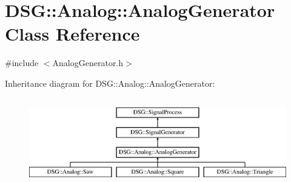 \hypertarget{classDSG_1_1Analog_1_1AnalogGenerator}{\section{D\-S\-G\-:\-:Analog\-:\-:Analog\-Generator Class Reference}
\label{classDSG_1_1Analog_1_1AnalogGenerator}
}


{\ttfamily \#include $<$Analog\-Generator.\-h$>$}

Inheritance diagram for D\-S\-G\-:\-:Analog\-:\-:Analog\-Generator\-:\begin{figure}[H]
\begin{center}
\leavevmode
\includegraphics[height=3.829060cm]{classDSG_1_1Analog_1_1AnalogGenerator}
\end{center}
\end{figure}
